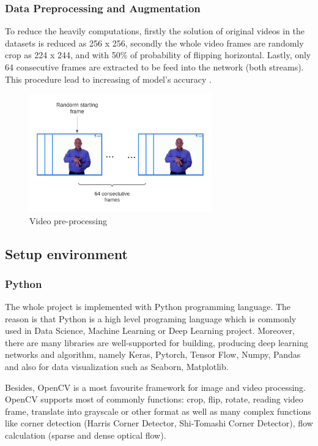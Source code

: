 \documentclass[a4paper, 12pt]{article}
\begin{document}
\subsubsection{Data Preprocessing and Augmentation}
To reduce the heavily computations, firstly the solution of original videos in the datasets is reduced as 256 x 256, secondly the whole video frames are randomly crop as 224 x 244, and with 50\% of probability of flipping horizontal. Lastly, only 64 consecutive frames are extracted to be feed into the network (both streams). This procedure lead to increasing of model's accuracy \citep{karpathy2014large}.

\begin{figure}[H]
    \centering
    \includegraphics[width=0.7\textwidth]{data pre-processing.png}
    \caption{Video pre-processing}
    \label{fig:data preprocessing}
\end{figure}

\subsection{Setup environment}
\subsubsection{Python}
The whole project is implemented with Python programming language. The reason is that Python is a high level programing language which is commonly used in Data Science, Machine Learning or Deep Learning project. Moreover, there are many libraries are well-supported for building, producing deep learning networks and algorithm, namely Keras, Pytorch, Tensor Flow, Numpy, Pandas and also for data visualization such as Seaborn, Matplotlib.

Besides, OpenCV is a most favourite framework for image and video processing. OpenCV supports most of commonly functions: crop, flip, rotate, reading video frame, translate into grayscale or other format as well as many complex functions like corner detection (Harris Corner Detector, Shi-Tomashi Corner Detector), flow calculation (sparse and dense optical flow).
\end{document}
